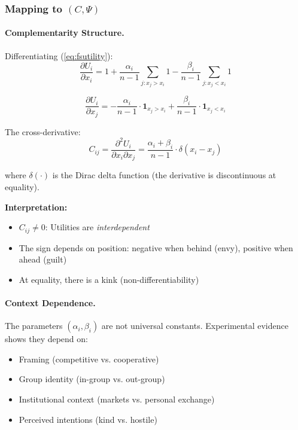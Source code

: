 \documentclass[12pt,a4paper]{article}
\begin{document}
\subsubsection{Mapping to $(C, \Psi)$}

\paragraph{Complementarity Structure.}
Differentiating (\ref{eq:fsutility}):
\begin{equation}
  \frac{\partial U_i}{\partial x_i} = 1 + \frac{\alpha_i}{n-1} \sum_{j: x_j > x_i} 1
                                    - \frac{\beta_i}{n-1} \sum_{j: x_j < x_i} 1
\end{equation}

\begin{equation}
  \frac{\partial U_i}{\partial x_j} = -\frac{\alpha_i}{n-1} \cdot \mathbf{1}_{x_j > x_i}
                                    + \frac{\beta_i}{n-1} \cdot \mathbf{1}_{x_j < x_i}
\end{equation}

The cross-derivative:
\begin{equation}
  C_{ij} = \frac{\partial^2 U_i}{\partial x_i \partial x_j} 
         = \frac{\alpha_i + \beta_i}{n-1} \cdot \delta(x_i - x_j)
  \label{eq:fscomplementarity}
\end{equation}

where $\delta(\cdot)$ is the Dirac delta function (the derivative is discontinuous at equality).

\textbf{Interpretation:}
\begin{itemize}
  \item $C_{ij} \neq 0$: Utilities are \emph{interdependent}
  \item The sign depends on position: negative when behind (envy), positive when ahead (guilt)
  \item At equality, there is a kink (non-differentiability)
\end{itemize}

\paragraph{Context Dependence.}
The parameters $(\alpha_i, \beta_i)$ are not universal constants.
Experimental evidence shows they depend on:
\begin{itemize}
  \item Framing (competitive vs. cooperative)
  \item Group identity (in-group vs. out-group)
  \item Institutional context (markets vs. personal exchange)
  \item Perceived intentions (kind vs. hostile)
\end{itemize}
\end{document}
